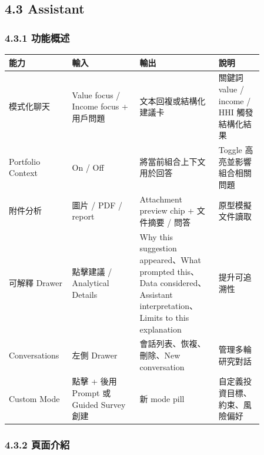 \subsection{4.3 Assistant}

\subsubsection{4.3.1 功能概述}

\begingroup
\small
\begin{longtable}{L{0.18\linewidth}L{0.24\linewidth}L{0.28\linewidth}L{0.16\linewidth}}
\toprule
\textbf{能力} & \textbf{輸入} & \textbf{輸出} & \textbf{說明} \\
\midrule
模式化聊天 & Value focus / Income focus + 用戶問題 & 文本回複或結構化建議卡 & 關鍵詞 value / income / HHI 觸發結構化結果 \\
Portfolio Context & On / Off & 將當前組合上下文用於回答 & Toggle 高亮並影響組合相關問題 \\
附件分析 & 圖片 / PDF / report & Attachment preview chip + 文件摘要 / 問答 & 原型模擬文件讀取 \\
可解釋 Drawer & 點擊建議 / Analytical Details & Why this suggestion appeared、What prompted this、Data considered、Assistant interpretation、Limits to this explanation & 提升可追溯性 \\
Conversations & 左側 Drawer & 會話列表、恢複、刪除、New conversation & 管理多輪研究對話 \\
Custom Mode & 點擊 + 後用 Prompt 或 Guided Survey 創建 & 新 mode pill & 自定義投資目標、約束、風險偏好 \\
\bottomrule
\end{longtable}
\endgroup

\subsubsection{4.3.2 頁面介紹}






